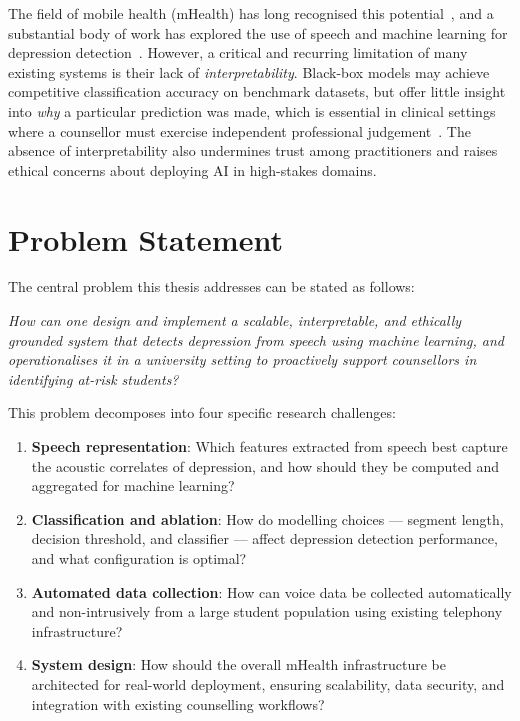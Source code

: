 The field of mobile health (mHealth) has long recognised this potential~\cite{Kumar2013}, and a substantial body of work has explored the use of speech and machine learning for depression detection~\cite{Low2020, Tlachac2022, Qin2024}. However, a critical and recurring limitation of many existing systems is their lack of \textit{interpretability}. Black-box models may achieve competitive classification accuracy on benchmark datasets, but offer little insight into \textit{why} a particular prediction was made, which is essential in clinical settings where a counsellor must exercise independent professional judgement~\cite{Thieme2020, Ma2023}. The absence of interpretability also undermines trust among practitioners and raises ethical concerns about deploying AI in high-stakes domains.

\section{Problem Statement}

The central problem this thesis addresses can be stated as follows:

\textit{How can one design and implement a scalable, interpretable, and ethically grounded system that detects depression from speech using machine learning, and operationalises it in a university setting to proactively support counsellors in identifying at-risk students?}

This problem decomposes into four specific research challenges:
\begin{enumerate}
    \item \textbf{Speech representation}: Which features extracted from speech best capture the acoustic correlates of depression, and how should they be computed and aggregated for machine learning?
    \item \textbf{Classification and ablation}: How do modelling choices — segment length, decision threshold, and classifier — affect depression detection performance, and what configuration is optimal?
    \item \textbf{Automated data collection}: How can voice data be collected automatically and non-intrusively from a large student population using existing telephony infrastructure?
    \item \textbf{System design}: How should the overall mHealth infrastructure be architected for real-world deployment, ensuring scalability, data security, and integration with existing counselling workflows?
\end{enumerate}

